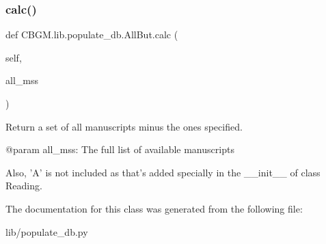 \subsubsection{\texorpdfstring{calc()}{calc()}}
{\footnotesize\ttfamily def C\+B\+G\+M.\+lib.\+populate\+\_\+db.\+All\+But.\+calc (\begin{DoxyParamCaption}\item[{}]{self,  }\item[{}]{all\+\_\+mss }\end{DoxyParamCaption})}

\begin{DoxyVerb}Return a set of all manuscripts minus the ones specified.

@param all_mss: The full list of available manuscripts

Also, 'A' is not included as that's added specially in the __init__ of
class Reading.
\end{DoxyVerb}
 

The documentation for this class was generated from the following file\+:\begin{DoxyCompactItemize}
\item 
lib/populate\+\_\+db.\+py\end{DoxyCompactItemize}

